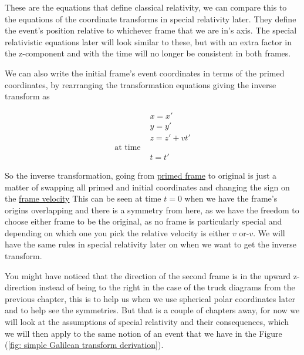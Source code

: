 These are the equations that define classical relativity, we can compare this to the equations of the coordinate transforms in special relativity later. They define the event's position relative to whichever frame that we are in's axis. The special relativistic equations later will look similar to these, but with an extra factor in the z-component and with the time will no longer be consistent in both frames.

We can also write the initial frame's event coordinates in terms of the primed coordinates, by rearranging the transformation equations giving the inverse transform as

\begin{equation}
	\begin{aligned}
		 & {x} = {x{'}}             \\
		 & {y} = {y{'}}             \\
		 & {z} = {z{'}} + {v}{t{'}} \\
		\text{at time \ \ \ }       \\
		 & {t} = {t{'}}
	\end{aligned}
	\label{eq: Inverse Galilean transformation}
\end{equation}

So the inverse transformation, going from \hyperlink{def-Primed-Frame}{primed frame} to original is just a matter of swapping all primed and initial coordinates and changing the sign on the \hyperlink{def-frame-velocity}{frame velocity}
This can be seen at time ${t} = 0$ when we have the frame's origins overlapping and there is a symmetry from here, as we have the freedom to choose either frame to be the original, as no frame is particularly special and depending on which one you pick the relative velocity is either ${v}$ or-${v}$. We will have the same rules in special relativity later on when we want to get the inverse transform.

You might have noticed that the direction of the second frame is in the upward z-direction instead of being to the right in the case of the truck diagrams from the previous chapter, this is to help us when we use spherical polar coordinates later and to help see the symmetries. But that is a couple of chapters away, for now we will look at the assumptions of special relativity and their consequences, which we will then apply to the same notion of an event that we have in the Figure (\ref{fig: simple Galilean transform derivation}).

